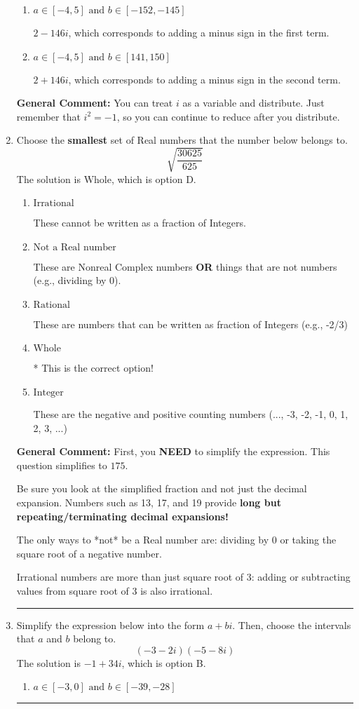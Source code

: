 \documentclass{extbook}[14pt]
\newcommand{\litem}[1]{\item #1

\rule{\textwidth}{0.4pt}}
\begin{document}
\begin{enumerate}
{\begin{enumerate}[label=\Alph*.]
* $-142 + 34 i$, which is the correct option.
\item \( a \in [-4, 5] \text{ and } b \in [-152, -145] \)

 $2 - 146 i$, which corresponds to adding a minus sign in the first term.
\item \( a \in [-4, 5] \text{ and } b \in [141, 150] \)

 $2 + 146 i$, which corresponds to adding a minus sign in the second term.
\end{enumerate}

\textbf{General Comment:} You can treat $i$ as a variable and distribute. Just remember that $i^2=-1$, so you can continue to reduce after you distribute.
}
\litem{
Choose the \textbf{smallest} set of Real numbers that the number below belongs to.
\[ \sqrt{\frac{30625}{625}} \]The solution is \( \text{Whole} \), which is option D.\begin{enumerate}[label=\Alph*.]
\item \( \text{Irrational} \)

These cannot be written as a fraction of Integers.
\item \( \text{Not a Real number} \)

These are Nonreal Complex numbers \textbf{OR} things that are not numbers (e.g., dividing by 0).
\item \( \text{Rational} \)

These are numbers that can be written as fraction of Integers (e.g., -2/3)
\item \( \text{Whole} \)

* This is the correct option!
\item \( \text{Integer} \)

These are the negative and positive counting numbers (..., -3, -2, -1, 0, 1, 2, 3, ...)
\end{enumerate}

\textbf{General Comment:} First, you \textbf{NEED} to simplify the expression. This question simplifies to $175$. 
 
 Be sure you look at the simplified fraction and not just the decimal expansion. Numbers such as 13, 17, and 19 provide \textbf{long but repeating/terminating decimal expansions!} 
 
 The only ways to *not* be a Real number are: dividing by 0 or taking the square root of a negative number. 
 
 Irrational numbers are more than just square root of 3: adding or subtracting values from square root of 3 is also irrational.
}
\litem{
Simplify the expression below into the form $a+bi$. Then, choose the intervals that $a$ and $b$ belong to.
\[ (-3 - 2 i)(-5 - 8 i) \]The solution is \( -1 + 34 i \), which is option B.\begin{enumerate}[label=\Alph*.]
\item \( a \in [-3, 0] \text{ and } b \in [-39, -28] \)


\end{enumerate}}
\end{enumerate}
\end{document}
